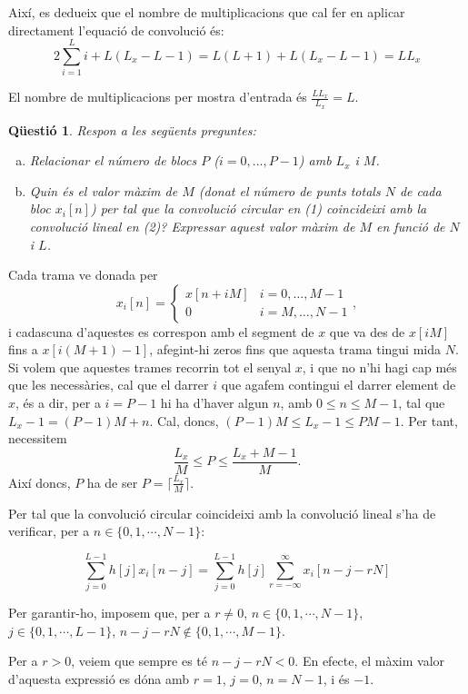 \documentclass[11pt,a4]{article}
\numberwithin{equation}{section}
\theoremstyle{thmstyle}
\theoremstyle{thmstyle}
\theoremstyle{thmstyle}
\theoremstyle{thmstyle}
\theoremstyle{thmstyle}
\theoremstyle{thmstyle}
\newtheorem{question}{Qüestió}
\begin{document}
Així, es dedueix que el nombre de multiplicacions que cal fer en aplicar directament l'equació de convolució és:
$$
2\sum\limits_{i=1}^{L} i + L(L_x - L - 1) = L(L+1)+L(L_x-L-1)=LL_x
$$

El nombre de multiplicacions per mostra d'entrada és $\frac{LL_x}{L_x}=L$.

\begin{question}
Respon a les següents preguntes:
\begin{enumerate}[a)]
\item Relacionar el número de blocs $P$ ($i=0,...,P-1$) amb $L_x$ i $M$.
\item Quin és el valor màxim de $M$ (donat el número de punts totals $N$ de cada bloc $x_i[n]$) per tal que la convolució circular en (1) coincideixi amb la convolució lineal en (2)?
Expressar aquest valor màxim de $M$ en funció de $N$ i $L$.
\end{enumerate}
\end{question}

Cada trama ve donada per
$$
x_i[n] =
\begin{cases}
x[n + iM] & i = 0,\ldots,M - 1 \\
0         & i = M, \ldots, N - 1
\end{cases},
$$
i cadascuna d'aquestes es correspon amb el segment de $x$ que va des de $x[iM]$ fins a $x[i(M + 1) - 1]$, afegint-hi zeros fins que aquesta trama tingui mida $N$. Si volem que aquestes trames recorrin tot el senyal $x$, i que no n'hi hagi cap més que les necessàries, cal que el darrer $i$ que agafem contingui el darrer element de $x$, és a dir, per a $i = P - 1$ hi ha d'haver algun $n$, amb $0 \leq n \leq M - 1$, tal que $L_x - 1 = (P-1)M + n$. Cal, doncs, $(P-1)M\leqslant L_x - 1 \leqslant PM - 1$. Per tant, necessitem
$$
\frac{L_x}{M}\leqslant P \leqslant \frac{L_x + M - 1}{M}.
$$
Així doncs, $P$ ha de ser $P = \big\lceil\frac{L_x}{M}\big\rceil$.


Per tal que la convolució circular coincideixi amb la convolució lineal s'ha de verificar, per a $n\in\lbrace 0, 1, \cdots, N-1 \rbrace$:

$$
\sum\limits_{j=0}^{L-1} h[j]x_i[n-j] = \sum\limits_{j=0}^{L-1} h[j]\sum\limits_{r=-\infty}^{\infty}x_i[n-j-rN]
$$

Per garantir-ho, imposem que, per a $r\neq 0$, $n\in\lbrace 0, 1, \cdots, N-1 \rbrace$, $j\in\lbrace 0, 1, \cdots, L-1 \rbrace$, $n-j-rN\not\in \lbrace 0, 1, \cdots, M-1 \rbrace$.

Per a $r>0$, veiem que sempre es té $n-j-rN<0$. En efecte, el màxim valor d'aquesta expressió es dóna amb $r = 1$, $j=0$, $n=N-1$, i és $-1$.
\end{document}
